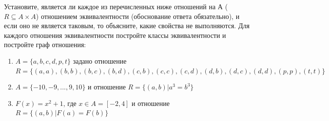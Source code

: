 \question
Установите, является ли каждое из перечисленных ниже отношений на А ($R \subseteq A \times A$) отношением эквивалентности (обоснование ответа обязательно), и если оно не является таковым, то объясните, какие свойства не выполняются. Для каждого отношения эквивалентности постройте классы эквивалентности и постройте граф отношения:
\begin{enumerate}
	\renewcommand{\labelenumi}{\alph{enumi})}
	\item $A = \{a, b, c, d, p, t\}$ задано отношение $R = \{(a, a), (b, b), (b, c), (b, d), (c, b), (c, c), (c, d), (d, b), (d, c), (d, d), (p,p), (t,t)\}$
	\item $A = \{-10, -9, ..., 9, 10\}$ и отношение $R = \{(a,b)|a^{3} = b^{3}\}$
	\item $F(x)=x^{2}+1$, где $x \in A = [-2, 4]$ и отношение $R = \{(a,b)|F(a) = F(b)\}$
\end{enumerate}